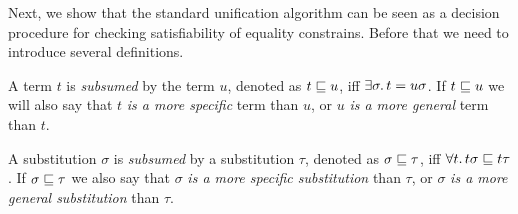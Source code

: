 
Next, we show that the standard unification algorithm
can be seen as a decision procedure 
for checking satisfiability of equality constrains.
Before that we need to introduce several definitions.

\begin{definition}
  A term $t$ is \emph{subsumed} by the term $u$, 
  denoted as $t \sqsubseteq u$,
  iff $\exists \sigma\ldotp t = {u}{\sigma}$.
  If $t \sqsubseteq u$ we will also say that 
  $t$ \emph{is a more specific} term than $u$,
  or $u$ \emph{is a more general} term than $t$.
\end{definition}

\begin{definition}
  A substitution $\sigma$ is \emph{subsumed} by a substitution $\tau$, 
  denoted as $\sigma \sqsubseteq \tau$,
  iff $\forall t\ldotp {t}{\sigma} \sqsubseteq {t}{\tau}$.
  If $\sigma \sqsubseteq \tau$ we also say that 
  $\sigma$ \emph{is a more specific substitution} than $\tau$,
  or $\sigma$ \emph{is a more general substitution} than $\tau$.
\end{definition}

